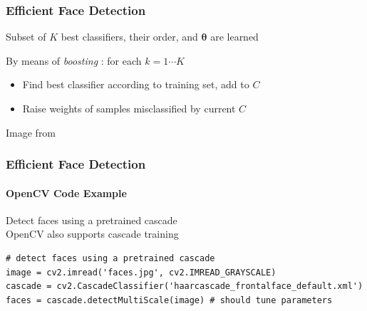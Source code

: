\documentclass[xetex,professionalfont]{beamer}
\newcommand{\bth}{\boldsymbol{\theta}}
\begin{document}

\begin{frame}
\frametitle{Efficient Face Detection}

Subset of $K$ best classifiers, their order, and $\bth$ are learned

\bigskip
By means of \emph{boosting} : for each $k=1\cdots K$
\begin{itemize}
    \item Find best classifier according to training set, add to $C$ %
    \item Raise weights of samples misclassified by current $C$
\end{itemize}

\bigskip
\begin{center}
    {\centering Image from \cite{szeliski2010}}
\end{center}

\end{frame}


\begin{frame}[fragile]
\frametitle{Efficient Face Detection}
\framesubtitle{OpenCV Code Example}

Detect faces using a pretrained cascade\\\medskip
OpenCV also supports cascade training

\bigskip
\footnotesize
\begin{verbatim}
# detect faces using a pretrained cascade
image = cv2.imread('faces.jpg', cv2.IMREAD_GRAYSCALE)
cascade = cv2.CascadeClassifier('haarcascade_frontalface_default.xml')
faces = cascade.detectMultiScale(image) # should tune parameters
\end{verbatim}

\end{frame}

\end{document}
